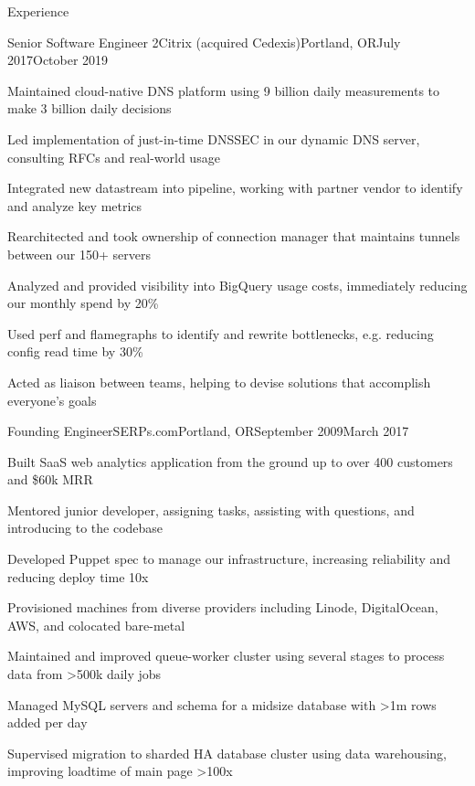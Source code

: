 \documentclass[letterpaper,10pt]{article}
\begin{document}
\begin{rsection}{Experience}
  \begin{rexperienceitem}{Senior Software Engineer 2}{Citrix (acquired Cedexis)}{Portland, OR}{July 2017}{October 2019}
  \item Maintained cloud-native DNS platform using 9 billion daily measurements to make 3 billion daily decisions
  \item Led implementation of just-in-time DNSSEC in our dynamic DNS server, consulting RFCs and real-world usage
  \item Integrated new datastream into pipeline, working with partner vendor to identify and analyze key metrics
  \item Rearchitected and took ownership of connection manager that maintains tunnels between our 150+ servers
  \item Analyzed and provided visibility into BigQuery usage costs, immediately reducing our monthly spend by 20\%
  \item Used perf and flamegraphs to identify and rewrite bottlenecks, e.g. reducing config read time by 30\%
  \item Acted as liaison between teams, helping to devise solutions that accomplish everyone's goals
\end{rexperienceitem}
\begin{rexperienceitem}{Founding Engineer}{SERPs.com}{Portland, OR}{September 2009}{March 2017}
  \item Built SaaS web analytics application from the ground up to over 400 customers and \$60k MRR
  \item Mentored junior developer, assigning tasks, assisting with questions, and introducing to the codebase
  \item Developed Puppet spec to manage our infrastructure, increasing reliability and reducing deploy time 10x
  \item Provisioned machines from diverse providers including Linode, DigitalOcean, AWS, and colocated bare-metal
  \item Maintained and improved queue-worker cluster using several stages to process data from \textgreater500k daily jobs
  \item Managed MySQL servers and schema for a midsize database with \textgreater1m rows added per day
  \item Supervised migration to sharded HA database cluster using data warehousing,
        improving loadtime of main page \textgreater100x

\end{rexperienceitem}
\end{rsection}
\end{document}
